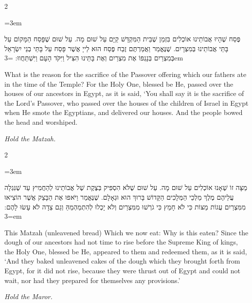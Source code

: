 \documentclass[11pt, openany]{book}
\newcommand{\instruction}[1]{%
  \par\vspace{3pt}
  \begin{tcolorbox}[
    enhanced,
    breakable,
    colback=sederlight,
    colframe=sederlight,
    boxrule=0pt,
    left=10pt,
    right=6pt,
    top=4pt,
    bottom=4pt,
    borderline west={2pt}{0pt}{sederwine!60},
    arc=0pt,
    outer arc=0pt,
  ]
    {\small\itshape\textcolor{sederwine}{#1}}
  \end{tcolorbox}
  \par\vspace{2pt}
}
\newenvironment{bilingual}{%
  \par\vspace{4pt}%
  \begin{paracol}{2}%
}{%
  \end{paracol}%
  \par\vspace{2pt}%
}
\newenvironment{hebrewcol}{%
  \switchcolumn[1]%
  \begingroup
  \RTL
  \hebrewfont\large
  \setstretch{1.4}%
  \emergencystretch=3em
  \tolerance=9999
  \parindent=0pt\relax
}{%
  \endRTL
  \endgroup
}
\newenvironment{englishcol}{%
  \switchcolumn[0]%
  \begingroup
  \setstretch{1.4}%
  \emergencystretch=3em
  \tolerance=9999
  \normalsize
  \rightskip=0.12in\relax
}{%
  \endgroup
}
\begin{document}
\begin{bilingual}
\begin{hebrewcol}
פֶּסַח שֶׁהָיוּ אֲבוֹתֵינוּ אוֹכְלִים בִּזְמַן שֶׁבֵּית הַמִּקְדָּשׁ קַיָּם עַל שׁוּם מָה. עַל שׁוּם שֶׁפָּסַח הַמָּקוֹם עַל בָּתֵּי אֲבוֹתֵינוּ בְּמִצְרָיִם. שֶׁנֶּאֱמַר וַאֲמַרְתֶּם זֶבַח פֶּסַח הוּא לַייָ אֲשֶׁר פָּסַח עַל בָּתֵּי בְנֵי יִשְׂרָאֵל בְּמִצְרַיִם בְּנָגְפּוֹ אֶת מִצְרַיִם וְאֶת בָּתֵּינוּ הִצִּיל וַיִּקֹּד הָעָם וַיִּשְׁתַּחֲווּ:
\end{hebrewcol}
\begin{englishcol}
What is the reason for the sacrifice of the Passover offering which our fathers ate in the time of the Temple? For the Holy One, blessed be He, passed over the houses of our ancestors in Egypt, as it is said, `You shall say it is the sacrifice of the Lord's Passover, who passed over the houses of the children of Israel in Egypt when He smote the Egyptians, and delivered our houses. And the people bowed the head and worshiped.
\end{englishcol}
\end{bilingual}
\instruction{Hold the Matzah.}

\begin{bilingual}
\begin{hebrewcol}
מַצָּה זוֹ שֶׁאָנוּ אוֹכְלִים עַל שׁוּם מָה. עַל שׁוּם שֶׁלֹּא הִסְפִּיק בְּצֶקֶת שֶׁל אֲבוֹתֵינוּ לְהַחֲמִיץ עַד שֶׁנִּגְלָה עֲלֵיהֶם מֶלֶךְ מַלְכֵי הַמְּלָכִים הַקָּדוֹשׁ בָּרוּךְ הוּא וּגְאָלָם. שֶׁנֶּאֱמַר וַיֹּאפוּ אֶת הַבָּצֵק אֲשֶׁר הוֹצִיאוּ מִמִּצְרַיִם עֻגוֹת מַצּוֹת כִּי לֹא חָמֵץ כִּי גֹרְשׁוּ מִמִּצְרַיִם וְלֹא יָכְלוּ לְהִתְמַהְמֵהַּ וְגַם צֵדָה לֹא עָשׂוּ לָהֶם:
\end{hebrewcol}
\begin{englishcol}
This Matzah (unleavened bread) Which we now eat: Why is this eaten? Since the dough of our ancestors had not time to rise before the Supreme King of kings, the Holy One, blessed be He, appeared to them and redeemed them, as it is said, `And they baked unleavened cakes of the dough which they brought forth from Egypt, for it did not rise, because they were thrust out of Egypt and could not wait, nor had they prepared for themselves any provisions.'
\end{englishcol}
\end{bilingual}
\instruction{Hold the Maror.}
\end{document}
